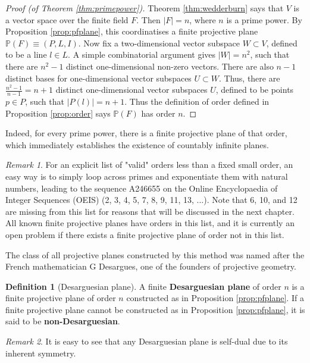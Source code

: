 \documentclass{report}
\renewcommand{\P}{\mathbb{P}}
\theoremstyle{definition}\newtheorem*{definition}{Definition}
\theoremstyle{definition}\newtheorem*{example}{Example}
\theoremstyle{remark}\newtheorem*{remark}{Remark}
\begin{document}
\begin{proof}[Proof (of Theorem \ref{thm:primepower})]
Theorem \ref{thm:wedderburn} says that $ V $ is a vector space over the finite field $ F $. Then $ |F| = n $, where $ n $ is a prime power. By Proposition \ref{prop:pfplane}, this coordinatises a finite projective plane $ \P(F) \equiv (P, L, I) $. Now fix a two-dimensional vector subspace $ W \subset V $, defined to be a line $ l \in L $. A simple combinatorial argument gives $ |W| = n^2 $, such that there are $ n^2 - 1 $ distinct one-dimensional non-zero vectors. There are also $ n - 1 $ distinct bases for one-dimensional vector subspaces $ U \subset W $. Thus, there are $ \frac{n^2 - 1}{n - 1} = n + 1 $ distinct one-dimensional vector subspaces $ U $, defined to be points $ p \in P $, such that $ |P(l)| = n + 1 $. Thus the definition of order defined in Proposition \ref{prop:order} says $ \P(F) $ has order $ n $.
\end{proof}

Indeed, for every prime power, there is a finite projective plane of that order, which immediately establishes the existence of countably infinite planes.

\begin{remark}
For an explicit list of "valid" orders less than a fixed small order, an easy way is to simply loop across primes and exponentiate them with natural numbers, leading to the sequence A246655 on the Online Encyclopaedia of Integer Sequences (OEIS) \cite{A246655} (2, 3, 4, 5, 7, 8, 9, 11, 13, ...). Note that 6, 10, and 12 are missing from this list for reasons that will be discussed in the next chapter. All known finite projective planes have orders in this list, and it is currently an open problem if there exists a finite projective plane of order not in this list.
\end{remark}

The class of all projective planes constructed by this method was named after the French mathematician G Desargues, one of the founders of projective geometry.

\begin{definition}[Desarguesian plane]
A finite \textbf{Desarguesian plane} of order $ n $ is a finite projective plane of order $ n $ constructed as in Proposition \ref{prop:pfplane}. If a finite projective plane cannot be constructed as in Proposition \ref{prop:pfplane}, it is said to be \textbf{non-Desarguesian}.
\end{definition}

\begin{remark}
It is easy to see that any Desarguesian plane is self-dual due to its inherent symmetry.
\end{remark}
\end{document}
